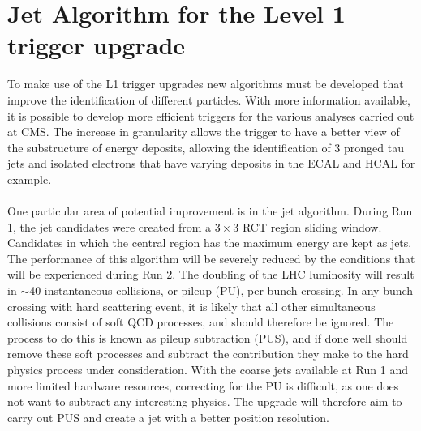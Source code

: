 \section{Jet Algorithm for the Level 1 trigger upgrade}
To make use of the L1 trigger upgrades new algorithms must be developed that improve the identification of different particles. With more information available, it is possible to develop more efficient triggers for the various analyses carried out at CMS. The increase in granularity allows the trigger to have a better view of the substructure of energy deposits, allowing the identification of 3 pronged tau jets and isolated electrons that have varying deposits in the ECAL and HCAL for example. 
\\\\
One particular area of potential improvement is in the jet algorithm. During Run 1, the jet candidates were created from a $3\times3$ RCT region sliding window. Candidates in which the central region has the maximum energy are kept as jets. The performance of this algorithm will be severely reduced by the conditions that will be experienced during Run 2. The doubling of the LHC luminosity will result in $\sim$40 instantaneous collisions, or pileup (PU), per bunch crossing. In any bunch crossing with hard scattering event, it is likely that all other simultaneous collisions consist of soft QCD processes, and should therefore be ignored. The process to do this is known as pileup subtraction (PUS), and if done well should remove these soft processes and subtract the contribution they make to the hard physics process under consideration. With the coarse jets available at Run 1 and more limited hardware resources, correcting for the PU is difficult, as one does not want to subtract any interesting physics. The upgrade will therefore aim to carry out PUS and create a jet with a better position resolution.

